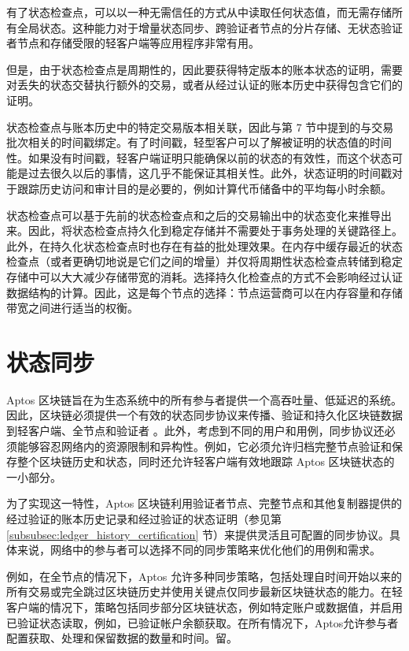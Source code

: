 \documentclass{article}
\begin{document}
有了状态检查点，可以以一种无需信任的方式从中读取任何状态值，而无需存储所有全局状态。这种能力对于增量状态同步、跨验证者节点的分片存储、无状态验证者节点和存储受限的轻客户端等应用程序非常有用。

但是，由于状态检查点是周期性的，因此要获得特定版本的账本状态的证明，需要对丢失的状态交替执行额外的交易，或者从经过认证的账本历史中获得包含它们的证明。

状态检查点与账本历史中的特定交易版本相关联，因此与第 7 节中提到的与交易批次相关的时间戳绑定。有了时间戳，轻型客户可以了解被证明的状态值的时间性。如果没有时间戳，轻客户端证明只能确保以前的状态的有效性，而这个状态可能是过去很久以后的事情，这几乎不能保证其相关性。此外，状态证明的时间戳对于跟踪历史访问和审计目的是必要的，例如计算代币储备中的平均每小时余额。

状态检查点可以基于先前的状态检查点和之后的交易输出中的状态变化来推导出来。因此，将状态检查点持久化到稳定存储并不需要处于事务处理的关键路径上。此外，在持久化状态检查点时也存在有益的批处理效果。在内存中缓存最近的状态检查点（或者更确切地说是它们之间的增量）并仅将周期性状态检查点转储到稳定存储中可以大大减少存储带宽的消耗。选择持久化检查点的方式不会影响经过认证数据结构的计算。因此，这是每个节点的选择：节点运营商可以在内存容量和存储带宽之间进行适当的权衡。


\section{状态同步}
\label{sub:state_sync}

Aptos 区块链旨在为生态系统中的所有参与者提供一个高吞吐量、低延迟的系统。因此，区块链必须提供一个有效的状态同步协议来传播、验证和持久化区块链数据到轻客户端、全节点和验证者 \cite{evolution_state_sync}。此外，考虑到不同的用户和用例，同步协议还必须能够容忍网络内的资源限制和异构性。例如，它必须允许归档完整节点验证和保存整个区块链历史和状态，同时还允许轻客户端有效地跟踪 Aptos 区块链状态的一小部分。

为了实现这一特性，Aptos 区块链利用验证者节点、完整节点和其他复制器提供的经过验证的账本历史记录和经过验证的状态证明（参见第 \ref{subsubsec:ledger_history_certification} 节）来提供灵活且可配置的同步协议。具体来说，网络中的参与者可以选择不同的同步策略来优化他们的用例和需求。

例如，在全节点的情况下，Aptos 允许多种同步策略，包括处理自时间开始以来的所有交易或完全跳过区块链历史并使用关键点仅同步最新区块链状态的能力。在轻客户端的情况下，策略包括同步部分区块链状态，例如特定账户或数据值，并启用已验证状态读取，例如，已验证帐户余额获取。在所有情况下，Aptos允许参与者配置获取、处理和保留数据的数量和时间。留。
\end{document}
